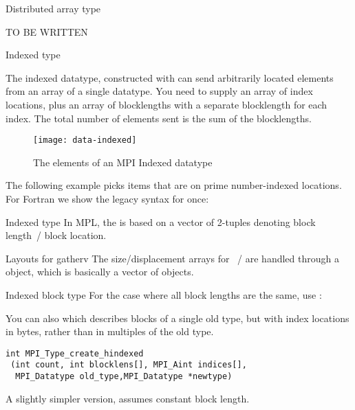  {Distributed array type}

TO BE WRITTEN

 {Indexed type}
\label{sec:data:indexed}

The indexed datatype, constructed with 
can send arbitrarily located elements from an array of a single datatype.
You need to supply an array of index locations, plus an array of blocklengths
with a separate blocklength for each index. The total number of elements sent
is the sum of the blocklengths.

\begin{figure}[t]
  \texttt{[image: data-indexed]}
  \caption{The elements of an MPI Indexed datatype}
  \label{fig:data-indexed}
\end{figure}

The following example picks items that are on prime number-indexed
locations.
%
For Fortran we show the legacy syntax for once:
%
%

\begin{mplnote}{Indexed type}
  In \ac{MPL}, the  is based on a vector
  of 2-tuples denoting block length~/ block location.
\end{mplnote}

\begin{mplnote}{Layouts for gatherv}
  The size/displacement arrays for ~/
   are handled through a
   object, which is basically a vector of
   objects.
\end{mplnote}

\begin{mplnote}{Indexed block type}
  For the case where all block lengths are the same,
  use :
\end{mplnote}

You can also  which describes blocks
of a single old type, but with index locations in bytes, rather than
in multiples of the old type.
\begin{lstlisting}
int MPI_Type_create_hindexed
 (int count, int blocklens[], MPI_Aint indices[],
  MPI_Datatype old_type,MPI_Datatype *newtype)
\end{lstlisting}
A slightly simpler version,
assumes constant block length.

